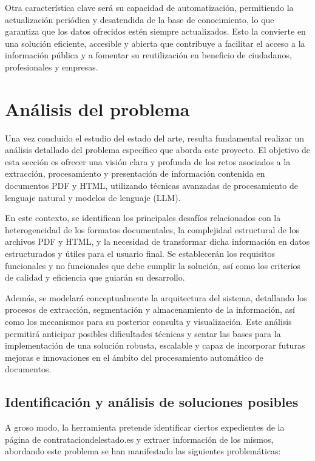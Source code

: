 \documentclass{article}
\begin{document}
Otra característica clave será su capacidad de automatización, permitiendo la actualización periódica y desatendida de la base de conocimiento, lo que garantiza que los datos ofrecidos estén siempre actualizados. Esto la convierte en una solución eficiente, accesible y abierta que contribuye a facilitar el acceso a la información pública y a fomentar su reutilización en beneficio de ciudadanos, profesionales y empresas.

\newpage


\section{Análisis del problema}
Una vez concluido el estudio del estado del arte, resulta fundamental realizar un análisis detallado del problema específico que aborda este proyecto. El objetivo de esta sección es ofrecer una visión clara y profunda de los retos asociados a la extracción, procesamiento y presentación de información contenida en documentos PDF y HTML, utilizando técnicas avanzadas de procesamiento de lenguaje natural y modelos de lenguaje (LLM).

En este contexto, se identifican los principales desafíos relacionados con la heterogeneidad de los formatos documentales, la complejidad estructural de los archivos PDF y HTML, y la necesidad de transformar dicha información en datos estructurados y útiles para el usuario final. Se establecerán los requisitos funcionales y no funcionales que debe cumplir la solución, así como los criterios de calidad y eficiencia que guiarán su desarrollo.

Además, se modelará conceptualmente la arquitectura del sistema, detallando los procesos de extracción, segmentación y almacenamiento de la información, así como los mecanismos para su posterior consulta y visualización. Este análisis permitirá anticipar posibles dificultades técnicas y sentar las bases para la implementación de una solución robusta, escalable y capaz de incorporar futuras mejoras e innovaciones en el ámbito del procesamiento automático de documentos.

\subsection{Identificación y análisis de soluciones posibles}
A groso modo, la herramienta pretende identificar ciertos expedientes de la página de contrataciondelestado.es y extraer información de los mismos, abordando este problema se han manifestado las siguientes problemáticas: 
\end{document}
